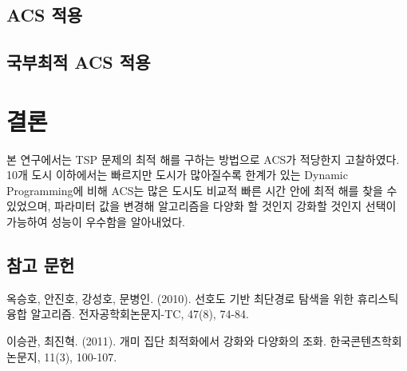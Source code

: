 \documentclass{kcc}
\begin{document}
\subsection{ACS 적용}

\subsection{국부최적 ACS 적용}

\section{결론}
 본 연구에서는 TSP 문제의 최적 해를 구하는 방법으로 ACS가 적당한지 고찰하였다. 10개 도시 이하에서는 빠르지만 도시가 많아질수록 한계가 있는 Dynamic Programming에 비해 ACS는 많은 도시도 비교적 빠른 시간 안에 최적 해를 찾을 수 있었으며, 파라미터 값을 변경해 알고리즘을 다양화 할 것인지 강화할 것인지 선택이 가능하여 성능이 우수함을 알아내었다.

\subsection{참고 문헌}

옥승호, 안진호, 강성호, 문병인. (2010). 선호도 기반 최단경로 탐색을 위한 휴리스틱 융합 알고리즘. 전자공학회논문지-TC, 47(8), 74-84.

이승관, 최진혁. (2011). 개미 집단 최적화에서 강화와 다양화의 조화. 한국콘텐츠학회논문지, 11(3), 100-107.



\end{document}
